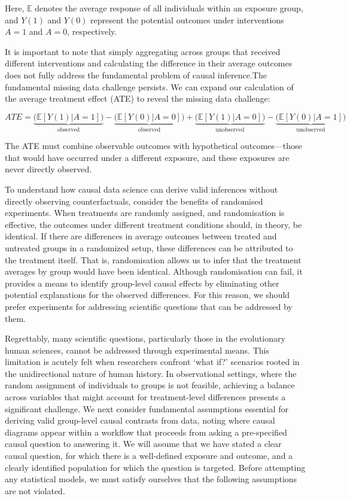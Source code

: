 \documentclass[
  singlecolumn,
  9pt]{article}
\begin{document}
Here, \(\mathbb{E}\) denotes the average response of all individuals
within an exposure group, and \(Y(1)\) and \(Y(0)\) represent the
potential outcomes under interventions \(A = 1\) and \(A = 0\),
respectively.

It is important to note that simply aggregating across groups that
received different interventions and calculating the difference in their
average outcomes does not fully address the fundamental problem of
causal inference.The fundamental missing data challenge persists. We can
expand our calculation of the average treatment effect (ATE) to reveal
the missing data challenge:

\[
ATE = \underbrace{\big(\mathbb{E}[Y(1)|A = 1]\big)}_{\text{observed}} - \underbrace{\big(\mathbb{E}[Y(0)|A = 0]\big)}_{\text{observed}} + \underbrace{\big(\mathbb{E}[Y(1)|A = 0]\big)}_{\text{unobserved}} - \underbrace{\big(\mathbb{E}[Y(0)|A = 1]\big)}_{\text{unobserved}}
\]

The ATE must combine observable outcomes with hypothetical
outcomes---those that would have occurred under a different exposure,
and these exposures are never directly observed.

To understand how causal data science can derive valid inferences
without directly observing counterfactuals, consider the benefits of
randomised experiments. When treatments are randomly assigned, and
randomisation is effective, the outcomes under different treatment
conditions should, in theory, be identical. If there are differences in
average outcomes between treated and untreated groups in a randomized
setup, these differences can be attributed to the treatment itself. That
is, randomisation allows us to infer that the treatment averages by
group would have been identical. Although randomisation can fail, it
provides a means to identify group-level causal effects by eliminating
other potential explanations for the observed differences. For this
reason, we should prefer experiments for addressing scientific questions
that can be addressed by them.

Regrettably, many scientific questions, particularly those in the
evolutionary human sciences, cannot be addressed through experimental
means. This limitation is acutely felt when researchers confront `what
if?' scenarios rooted in the unidirectional nature of human history. In
observational settings, where the random assignment of individuals to
groups is not feasible, achieving a balance across variables that might
account for treatment-level differences presents a significant
challenge. We next consider fundamental assumptions essential for
deriving valid group-level causal contrasts from data, noting where
causal diagrams appear within a workflow that proceeds from asking a
pre-specified causal question to answering it. We will assume that we
have stated a clear causal question, for which there is a well-defined
exposure and outcome, and a clearly identified population for which the
question is targeted. Before attempting any statistical models, we must
satisfy ourselves that the following assumptions are not violated.
\end{document}
